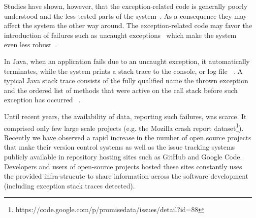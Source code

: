 \documentclass[conference]{IEEEtran}
\begin{document}
Studies have shown, however, that the exception-related code is generally poorly understood and the
 less tested parts of the system~\cite{miller1997issues,Robil00,shah2010understanding, 
garcia2007extracting,garcia2001comparative,cabral2007exception,coelho2011unveiling}.
As a consequence they may affect the system the other way around.
The exception-related code may favor the introduction of failures such as 
uncaught exceptions~\cite{jo2004uncaught, zhang2012amplifying}
which make the system even less robust~\cite{coelho2011unveiling}.

In Java, when an application fails due to an uncaught exception, 
it automatically terminates, while the system prints a stack trace to the console, 
or log file ~\cite{gosling2000java}.  A typical Java stack trace consists of  the fully qualified name 
the thrown exception and the ordered list of methods that were active on the call stack before 
such exception has occurred ~\cite{gosling2000java,bloch2008effective}.

Until recent years, the availability of data, reporting such failures, was scarce. 
It comprised only few large scale projects (e.g. the Mozilla crash report dataset\footnote{https://code.google.com/p/promisedata/issues/detail?id=88}).
Recently we have observed a rapid increase in the number of open
source projects that make their version control systems as well as the issue tracking systems
publicly available in repository hosting sites such as GitHub and Google Code.
Developers and users of open-source projects hosted these sites 
constantly uses the provided infra-strucute to share information across 
the software development (including exception stack traces detected).

\end{document}
